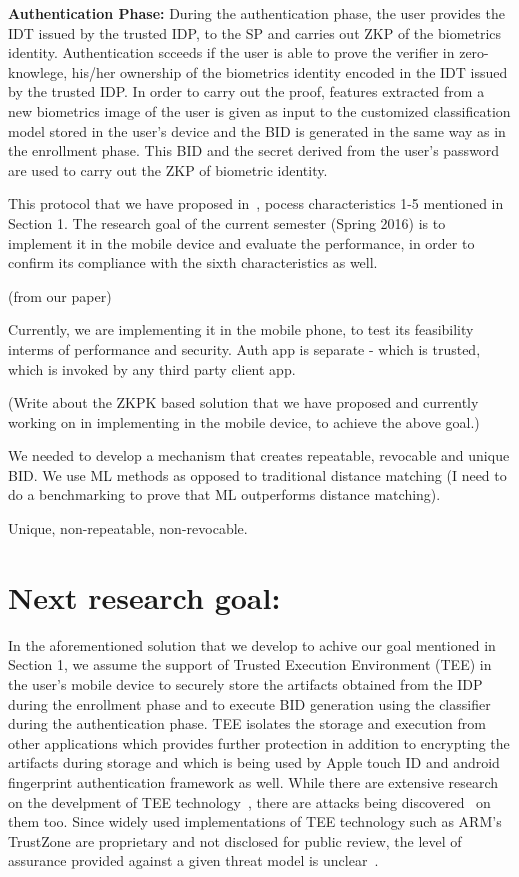 \documentclass[10pt]{article}
\begin{document}
\textbf{Authentication Phase:}
During the authentication phase, the user provides the IDT issued by the trusted IDP, to the SP and carries out ZKP of the biometrics identity.
Authentication scceeds if the user is able to prove the verifier in zero-knowlege, his/her ownership of the biometrics identity 
encoded in the IDT issued by the trusted IDP. In order to carry out the proof, features extracted from a new biometrics image of the user is given as 
input to the customized classification model stored in the user's device and the BID is generated in the same way as in the enrollment phase. This 
BID and the secret derived from the user's password are used to carry out the ZKP of biometric identity.

This protocol that we have proposed in~\cite{outs}, pocess characteristics 1-5 mentioned in Section 1. The research goal of the current semester 
(Spring 2016) is to implement it in the mobile device and evaluate the performance, in order to confirm its compliance with the sixth 
characteristics as well. 


(from our paper)

Currently, we are implementing it in the mobile phone, to test its feasibility interms of performance and security.
Auth app is separate - which is trusted, which is invoked by any third party client app.


(Write about the ZKPK based solution that we have proposed and currently working on in implementing in the mobile device, to achieve the above 
goal.)


We needed to develop a mechanism that creates repeatable, revocable and 
unique BID. We use ML methods as opposed to traditional distance matching (I need to do a benchmarking to prove that ML outperforms distance 
matching).

Unique, non-repeatable, non-revocable.\\


\section{Next research goal:}
In the aforementioned solution that we develop to achive our goal mentioned in Section 1, we assume the support of Trusted Execution Environment 
(TEE) in the user's mobile device to securely store the artifacts obtained from the IDP during the enrollment phase and to execute BID generation 
using the classifier during the authentication phase. TEE isolates the storage and execution from other applications which provides further 
protection in addition to encrypting the artifacts during storage and which is being used by Apple touch ID and android fingerprint authentication 
framework as well.
While there are extensive research on the develpment of TEE technology~\cite{tee}, there are attacks being discovered~\cite{blackhat} on them too. 
Since widely used implementations of TEE technology such as ARM's TrustZone are proprietary and not disclosed for public review, the level of 
assurance provided against a given threat model is unclear~\cite{armtrustzone}. 
\end{document}

